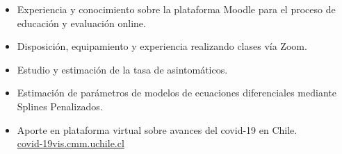 \documentclass[10pt,letterpaper,ragged2e]{altacv}
\begin{document}
\begin{paracol}{2}
\begin{itemize}
\item Experiencia y conocimiento sobre la plataforma Moodle para el proceso de educación y evaluación online.
\item Disposición, equipamiento y experiencia realizando clases vía Zoom.
\end{itemize}



\begin{itemize}
\item Estudio y estimación de la tasa de asintomáticos.
\item Estimación de parámetros de modelos de ecuaciones diferenciales mediante Splines Penalizados.
\item Aporte en plataforma virtual sobre avances del covid-19 en Chile.\\ \textcolor{blue}{\href{https://covid-19vis.cmm.uchile.cl/info}{covid-19vis.cmm.uchile.cl}}
\end{itemize}




\\
\\

\divider\smallskip

\\
\\
\\
\\



\divider

\divider

\divider
\medskip


\end{paracol}
\end{document}
